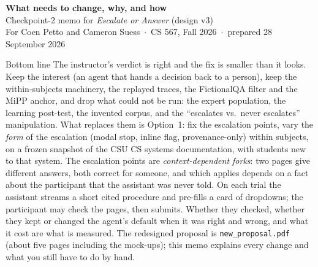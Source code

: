 \documentclass[9pt,letterpaper]{extarticle}
\begin{document}
{\sffamily
{\Large\bfseries\color{accent} What needs to change, why, and how}\\[3pt]
{\large Checkpoint-2 memo for \emph{Escalate or Answer} (design v3)}\\[2pt]
{\color{muted} For Coen Petto and Cameron Suess \,$\cdot$\, CS 567, Fall 2026 \,$\cdot$\, prepared 28 September 2026}
}

\vspace{4pt}
\noindent{\color{accent}\rule{\linewidth}{1.2pt}}

\begin{callout}{Bottom line}
The instructor's verdict is right and the fix is smaller than it looks. Keep the
interest (an agent that hands a decision back to a person), keep the
within-subjects machinery, the replayed traces, the FictionalQA filter and the
MiPP anchor, and drop what could not be run: the expert population, the
learning post-test, the invented corpus, and the ``escalates vs.\ never
escalates'' manipulation. What replaces them is Option~1: fix the escalation
points, vary the \emph{form} of the escalation (modal stop, inline flag,
provenance-only) within subjects, on a frozen snapshot of the CSU CS systems
documentation, with students new to that system. The escalation points are
\emph{context-dependent forks}: two pages give different answers, both correct
for someone, and which applies depends on a fact about the participant that
the assistant was never told. On each trial the assistant streams a short cited
procedure and pre-fills a card of dropdowns; the participant may check the
pages, then submits. Whether they checked, whether they kept or changed the
agent's default when it was right and wrong, and what it cost are what is
measured. The redesigned proposal is \texttt{new\_proposal.pdf} (about five
pages including the mock-ups); this memo explains every change and what you
still have to do by hand.
\end{callout}
\end{document}
